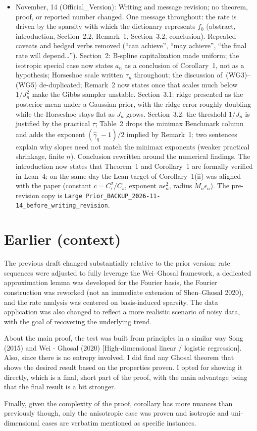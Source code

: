 \documentclass[11pt]{article}
\begin{document}
\begin{itemize}
    \item November, 14 (Official\_Version): Writing and message revision; no theorem, proof, or reported number changed. One message throughout: the rate is driven by the sparsity with which the dictionary represents $f_0$ (abstract, introduction, Section~2.2, Remark~1, Section~3.2, conclusion). Repeated caveats and hedged verbs removed (``can achieve'', ``may achieve'', ``the final rate will depend\ldots''). Section~2: B-spline capitalization made uniform; the isotropic special case now states $a_n$ as a conclusion of Corollary~1, not as a hypothesis; Horseshoe scale written $\tau_n$ throughout; the discussion of~(WG3)--(WG5) de-duplicated; Remark~2 now states once that scales much below $1/J_n^2$ make the Gibbs sampler unstable. Section~3.1: ridge presented as the posterior mean under a Gaussian prior, with the ridge error roughly doubling while the Horseshoe stays flat as $J_n$ grows. Section~3.2: the threshold $1/J_n$ is justified by the practical $\tau$; Table~2 drops the minimax Benchmark column and adds the exponent $(\widehat\gamma_q-1)/2$ implied by Remark~1; two sentences explain why slopes need not match the minimax exponents (weaker practical shrinkage, finite $n$). Conclusion rewritten around the numerical findings. The introduction now states that Theorem~1 and Corollary~1 are formally verified in Lean~4; on the same day the Lean target of Corollary~1(ii) was aligned with the paper (constant $c=C_\epsilon^2/C_s$, exponent $n\epsilon_n^2$, radius $M_n\epsilon_n$). The pre-revision copy is \texttt{Large Prior\_BACKUP\_2026-11-14\_before\_writing\_revision}.



\end{itemize}
\section*{Earlier (context)}

The previous draft changed substantially relative to the prior version: rate sequences were adjusted to fully leverage the Wei--Ghosal framework, a dedicated approximation lemma was developed for the Fourier basis, the Fourier construction was reworked (not an immediate extension of Shen--Ghosal 2020), and the rate analysis was centered on basis-induced sparsity. The data application was also changed to reflect a more realistic scenario of noisy data, with the goal of recovering the underlying trend.

About the main proof, the test was built from principles in a similar way Song (2015) and Wei - Ghosal (2020) [High-dimensional linear / logistic regression]. Also, since there is no entropy involved, I did find any Ghosal theorem that shows the desired result based on the properties proven. I opted for showing it directly, which is a final, short part of the proof, with the main advantage being that the final result is a bit stronger.

Finally, given the complexity of the proof, corollary has more nuances than previously though, only the anisotropic case was proven and isotropic and uni-dimensional cases are verbatim mentioned as specific instances.
\end{document}
